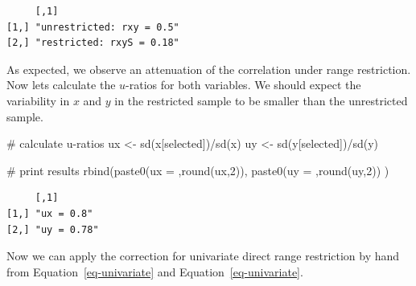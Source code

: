 \documentclass[
  letterpaper,
  DIV=11,
  numbers=noendperiod]{scrreprt}
\newenvironment{Shaded}{\begin{snugshade}}{\end{snugshade}}
\newcommand{\CommentTok}[1]{\textcolor[rgb]{0.37,0.37,0.37}{#1}}
\newcommand{\DecValTok}[1]{\textcolor[rgb]{0.68,0.00,0.00}{#1}}
\newcommand{\FunctionTok}[1]{\textcolor[rgb]{0.28,0.35,0.67}{#1}}
\newcommand{\NormalTok}[1]{\textcolor[rgb]{0.00,0.23,0.31}{#1}}
\newcommand{\OtherTok}[1]{\textcolor[rgb]{0.00,0.23,0.31}{#1}}
\newcommand{\SpecialCharTok}[1]{\textcolor[rgb]{0.37,0.37,0.37}{#1}}
\newcommand{\StringTok}[1]{\textcolor[rgb]{0.13,0.47,0.30}{#1}}
\begin{document}
\begin{verbatim}
     [,1]                     
[1,] "unrestricted: rxy = 0.5"
[2,] "restricted: rxyS = 0.18"
\end{verbatim}

As expected, we observe an attenuation of the correlation under range
restriction. Now lets calculate the \(u\)-ratios for both variables. We
should expect the variability in \(x\) and \(y\) in the restricted
sample to be smaller than the unrestricted sample.

\begin{Shaded}
\begin{Highlighting}[]
\CommentTok{\# calculate u{-}ratios}
\NormalTok{ux }\OtherTok{\textless{}{-}} \FunctionTok{sd}\NormalTok{(x[selected])}\SpecialCharTok{/}\FunctionTok{sd}\NormalTok{(x)}
\NormalTok{uy }\OtherTok{\textless{}{-}} \FunctionTok{sd}\NormalTok{(y[selected])}\SpecialCharTok{/}\FunctionTok{sd}\NormalTok{(y)}

\CommentTok{\# print results}
\FunctionTok{rbind}\NormalTok{(}\FunctionTok{paste0}\NormalTok{(}\StringTok{\textquotesingle{}ux = \textquotesingle{}}\NormalTok{,}\FunctionTok{round}\NormalTok{(ux,}\DecValTok{2}\NormalTok{)),}
      \FunctionTok{paste0}\NormalTok{(}\StringTok{\textquotesingle{}uy = \textquotesingle{}}\NormalTok{,}\FunctionTok{round}\NormalTok{(uy,}\DecValTok{2}\NormalTok{))}
\NormalTok{      )}
\end{Highlighting}
\end{Shaded}

\begin{verbatim}
     [,1]       
[1,] "ux = 0.8" 
[2,] "uy = 0.78"
\end{verbatim}

Now we can apply the correction for univariate direct range restriction
by hand from Equation~\ref{eq-univariate} and
Equation~\ref{eq-univariate}.
\end{document}
